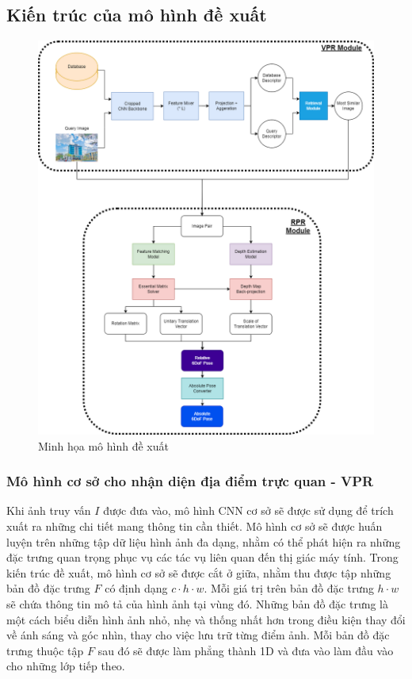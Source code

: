 \subsection{Kiến trúc của mô hình đề xuất}
\begin{figure}[H]
  \centering
  \includegraphics[width=\textwidth]{pics/Proposal/models.png}
  \caption{Minh họa mô hình đề xuất}
\end{figure}

\subsubsection{Mô hình cơ sở cho nhận diện địa điểm trực quan - VPR}

Khi ảnh truy vấn $I$ được đưa vào, mô hình CNN cơ sở sẽ được sử dụng để trích xuất ra những chi tiết mang thông tin cần thiết. Mô hình cơ sở sẽ được huấn luyện trên những tập dữ liệu hình ảnh đa dạng, nhằm có thể phát hiện ra những đặc trưng quan trọng phục vụ các tác vụ liên quan đến thị giác máy tính. Trong kiến trúc đề xuất, mô hình cơ sở sẽ được cắt ở giữa, nhằm thu được tập những bản đồ đặc trưng $F$ có định dạng $c \cdot h \cdot w$. Mỗi giá trị trên bản đồ đặc trưng $h \cdot w$ sẽ chứa thông tin mô tả của hình ảnh tại vùng đó. Những bản đồ đặc trưng là một cách biểu diễn hình ảnh nhỏ, nhẹ và thống nhất hơn trong điều kiện thay đổi về ánh sáng và góc nhìn, thay cho việc lưu trữ từng điểm ảnh. Mỗi bản đồ đặc trưng thuộc tập $F$ sau đó sẽ được làm phẳng thành 1D và đưa vào làm đầu vào cho những lớp tiếp theo.

